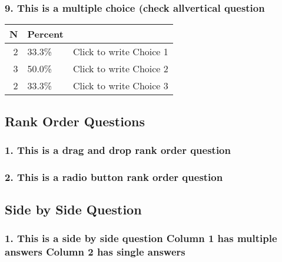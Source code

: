 \documentclass{article}\usepackage[]{graphicx}\usepackage[]{color}
\begin{document}
\hfill \break \hfill \break
\subsubsection*{9.
This is a multiple choice (check allvertical question}


\begin{tabular}{r|l|l}
\hline
N & Percent & \\
\hline
2 & 33.3\% & Click to write Choice 1\\
\hline
3 & 50.0\% & Click to write Choice 2\\
\hline
2 & 33.3\% & Click to write Choice 3\\
\hline
\end{tabular}


\hfill \break \hfill \break
\subsection*{Rank Order Questions}
\subsubsection*{1.
This is a drag and drop rank order question}


\hfill \break \hfill \break
\subsubsection*{2.
This is a radio button rank order question}


\hfill \break \hfill \break
\subsection*{Side by Side Question}
\subsubsection*{1.
This is a side by side question Column 1 has multiple answers Column 2 has single answers}


\hfill \break \hfill \break
\end{document}
